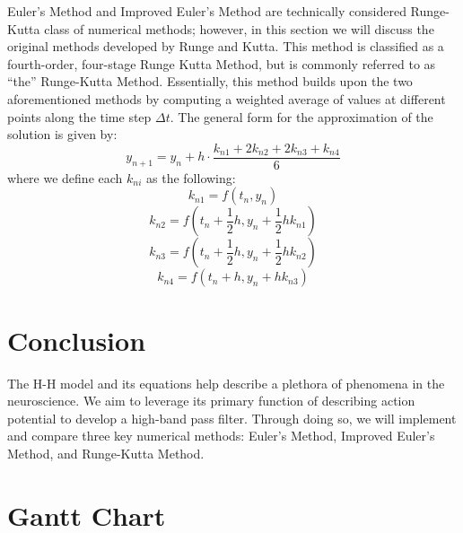 \documentclass{article} %
\begin{document}
\begin{multicols}{2}
Euler's Method and Improved Euler's Method are technically considered Runge-Kutta class of numerical methods; however, in this section we will discuss the original methods developed by Runge and Kutta.
This method is classified as a fourth-order, four-stage Runge Kutta Method, but is commonly referred to as ``the'' Runge-Kutta Method.
Essentially, this method builds upon the two aforementioned methods by computing a weighted average of values at different points along the time step $\Delta t$.
The general form for the approximation of the solution is given by:
\[
    y_{n+1} = y_{n} + h \cdot \frac{k_{n1} + 2k_{n2} + 2k_{n3} + k_{n4}}{6}
\]
where we define each $k_{ni}$ as the following:
\[
    k_{n1} = f(t_{n}, y_{n})
\]
\[
    k_{n2} = f\left(t_{n} + \frac{1}{2}h, y_{n} + \frac{1}{2}hk_{n1}\right)
\]
\[
    k_{n3} = f\left(t_{n} + \frac{1}{2}h, y_{n} + \frac{1}{2}hk_{n2}\right)
\]
\[
    k_{n4} = f(t_{n} + h, y_{n} + hk_{n3})
\]

\section{Conclusion}

The H-H model and its equations help describe a plethora of phenomena in the neuroscience.
We aim to leverage its primary function of describing action potential to develop a high-band pass filter.
Through doing so, we will implement and compare three key numerical methods: Euler's Method, Improved Euler's Method, and Runge-Kutta Method.

\label{last_page}

\newpage




\end{multicols}

\newpage
\appendix

\section{Gantt Chart}
\label{app: appendix_a}
\end{document}
